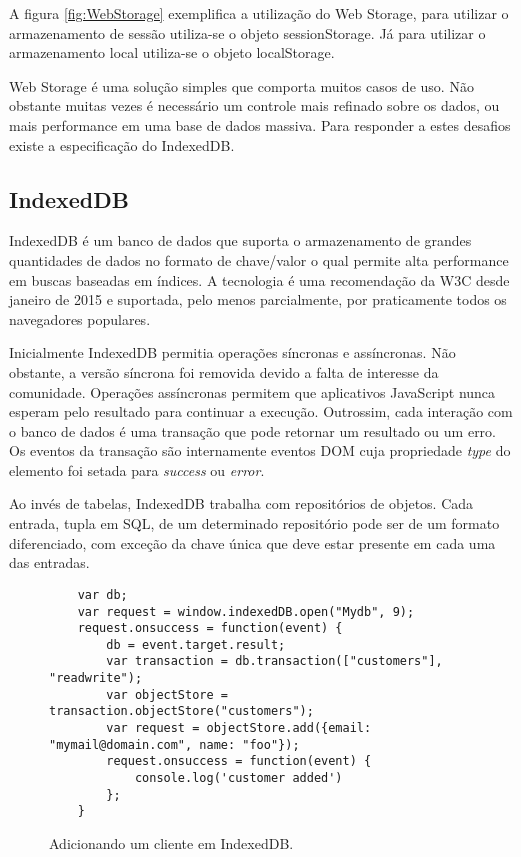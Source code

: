 A figura \ref{fig:WebStorage} exemplifica a utilização do Web
Storage, para utilizar o armazenamento de sessão utiliza-se o objeto
sessionStorage. Já para utilizar o armazenamento local utiliza-se o
objeto localStorage.

Web Storage é uma solução simples que comporta muitos casos de uso.
Não obstante muitas vezes é necessário um controle mais refinado
sobre os dados, ou mais performance em uma base de dados massiva. Para
responder a estes desafios existe a especificação do IndexedDB.

\subsection{IndexedDB}
IndexedDB é um banco de dados que suporta o armazenamento de grandes
quantidades de dados no formato de chave/valor o qual  permite alta
performance em buscas baseadas em índices. A tecnologia é uma recomendação
da W3C desde janeiro de 2015 e suportada, pelo menos parcialmente, por
praticamente todos os navegadores populares.

Inicialmente IndexedDB permitia operações síncronas e assíncronas.
Não obstante, a versão síncrona foi removida devido a falta de
interesse da comunidade. Operações assíncronas permitem que
aplicativos JavaScript nunca esperam pelo resultado para continuar a
execução. Outrossim, cada interação com o banco de dados é uma
transação que pode retornar um resultado ou um erro. Os eventos da
transação são internamente eventos DOM cuja propriedade \textit{type}
do elemento foi setada para \textit{success} ou \textit{error}.

Ao invés de tabelas, IndexedDB trabalha com repositórios de objetos.
Cada entrada, tupla em SQL, de um determinado repositório pode ser de
um formato diferenciado, com exceção da chave única que deve estar
presente em cada uma das entradas.

\begin{figure}
\centering
\begin{verbatim}
	var db;
	var request = window.indexedDB.open("Mydb", 9);
	request.onsuccess = function(event) {
		db = event.target.result;
		var transaction = db.transaction(["customers"], "readwrite");
		var objectStore = transaction.objectStore("customers");
		var request = objectStore.add({email: "mymail@domain.com", name: "foo"});
		request.onsuccess = function(event) {
			console.log('customer added')
		};
	}
\end{verbatim}
\caption{Adicionando um cliente em IndexedDB.}
\label{fig:IndexedDB}
\end{figure}

